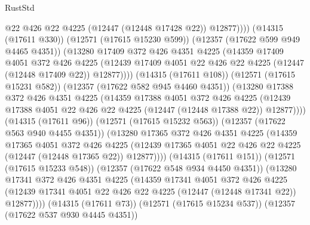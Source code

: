 \begin{lexlean}{RustStd}
\begin{coremodule}
                          @22
                          @426
                          @22
                          @4225
                          (@12447 (@12448 @17428 @22))
                          @12877))))
                  (@14315 (@17611 @330))
                  (@12571 (@17615 @15230 @599))
                  (@12357 (@17622 @599 @949 @4465 @4351))
                  (@13280
                    @17409
                    @372
                    @426
                    @4351
                    @4225
                    (@14359
                      @17409
                      @4051
                      @372
                      @426
                      @4225
                      (@12439
                        @17409
                        @4051
                        @22
                        @426
                        @22
                        @4225
                        (@12447 (@12448 @17409 @22))
                        @12877))))
                (@14315 (@17611 @108))
                (@12571 (@17615 @15231 @582))
                (@12357 (@17622 @582 @945 @4460 @4351))
                (@13280
                  @17388
                  @372
                  @426
                  @4351
                  @4225
                  (@14359
                    @17388
                    @4051
                    @372
                    @426
                    @4225
                    (@12439 @17388 @4051 @22 @426 @22 @4225 (@12447 (@12448 @17388 @22)) @12877))))
              (@14315 (@17611 @96))
              (@12571 (@17615 @15232 @563))
              (@12357 (@17622 @563 @940 @4455 @4351))
              (@13280
                @17365
                @372
                @426
                @4351
                @4225
                (@14359
                  @17365
                  @4051
                  @372
                  @426
                  @4225
                  (@12439 @17365 @4051 @22 @426 @22 @4225 (@12447 (@12448 @17365 @22)) @12877))))
            (@14315 (@17611 @151))
            (@12571 (@17615 @15233 @548))
            (@12357 (@17622 @548 @934 @4450 @4351))
            (@13280
              @17341
              @372
              @426
              @4351
              @4225
              (@14359
                @17341
                @4051
                @372
                @426
                @4225
                (@12439 @17341 @4051 @22 @426 @22 @4225 (@12447 (@12448 @17341 @22)) @12877))))
          (@14315 (@17611 @73))
          (@12571 (@17615 @15234 @537))
          (@12357 (@17622 @537 @930 @4445 @4351))

\end{coremodule}
\end{lexlean}
